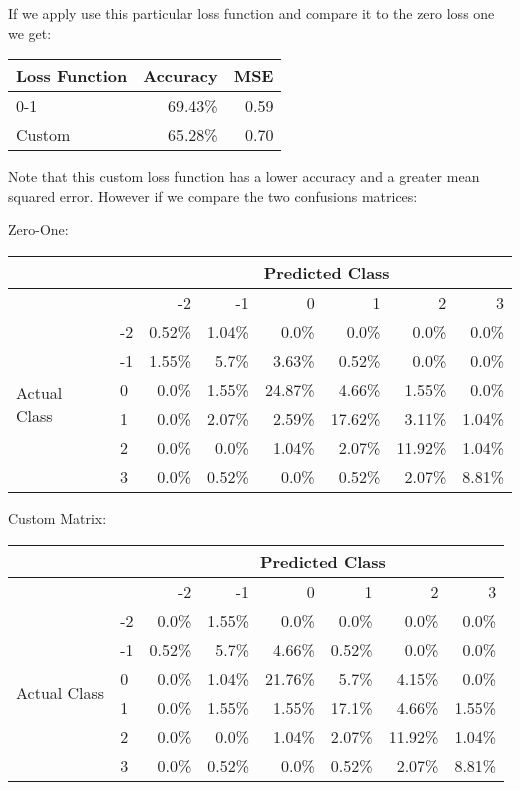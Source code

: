 If we apply use this particular loss function and compare it to the zero loss one we get:
\begin{center}
	\begin{tabular}{l r r}
		\hline
		Loss Function & Accuracy & MSE  \\
		\hline
		0-1           & 69.43\%  & 0.59 \\
		Custom        & 65.28\%  & 0.70 \\
		\hline
	\end{tabular}
\end{center}

Note that this custom loss function has a lower accuracy and a greater mean squared error.
However if we compare the two confusions matrices:

Zero-One:

\begin{tabular}{l l r r r r r r}
    \hline
                       &    & \multicolumn{6}{c}{Predicted Class}                   \\
    \hline
                       &    & -2      & -1    & 0       & 1       & 2       & 3     \\
    \hline
\multirow{6}{*}{Actual Class} & -2 & 0.52\% & 1.04\% & 0.0\% & 0.0\% & 0.0\% & 0.0\% \\
& -1 & 1.55\% & 5.7\% & 3.63\% & 0.52\% & 0.0\% & 0.0\% \\
& 0 & 0.0\% & 1.55\% & 24.87\% & 4.66\% & 1.55\% & 0.0\% \\
& 1 & 0.0\% & 2.07\% & 2.59\% & 17.62\% & 3.11\% & 1.04\% \\
& 2 & 0.0\% & 0.0\% & 1.04\% & 2.07\% & 11.92\% & 1.04\% \\
& 3 & 0.0\% & 0.52\% & 0.0\% & 0.52\% & 2.07\% & 8.81\% \\
\end{tabular}

Custom Matrix:

\begin{tabular}{l l r r r r r r}
    \hline
                       &    & \multicolumn{6}{c}{Predicted Class}                   \\
    \hline
                       &    & -2      & -1    & 0       & 1       & 2       & 3     \\
    \hline
\multirow{6}{*}{Actual Class} & -2 & 0.0\% & 1.55\% & 0.0\% & 0.0\% & 0.0\% & 0.0\% \\
& -1 & 0.52\% & 5.7\% & 4.66\% & 0.52\% & 0.0\% & 0.0\% \\
& 0 & 0.0\% & 1.04\% & 21.76\% & 5.7\% & 4.15\% & 0.0\% \\
& 1 & 0.0\% & 1.55\% & 1.55\% & 17.1\% & 4.66\% & 1.55\% \\
& 2 & 0.0\% & 0.0\% & 1.04\% & 2.07\% & 11.92\% & 1.04\% \\
& 3 & 0.0\% & 0.52\% & 0.0\% & 0.52\% & 2.07\% & 8.81\% \\
\end{tabular}

